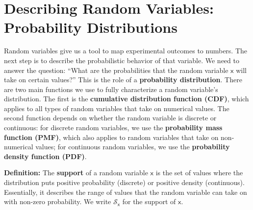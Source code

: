 \section{Describing Random Variables: Probability Distributions}
Random variables give us a tool to map experimental outcomes to numbers. The next step is to describe the probabilistic behavior of that variable. We need to answer the question: ``What are the probabilities that the random variable $\mathsf{x}$ will take on certain values?'' This is the role of a \textbf{probability distribution}. There are two main functions we use to fully characterize a random variable's distribution. The first is the \textbf{cumulative distribution function (CDF)}, which applies to all types of random variables that take on numerical values. The second function depends on whether the random variable is discrete or continuous: for discrete random variables, we use the \textbf{probability mass function (PMF)}, which also applies to random variables that take on non-numerical values; for continuous random variables, we use the \textbf{probability density function (PDF)}.

\begin{definitionBox}
    \textbf{Definition:} The \textbf{support} of a random variable $\mathsf{x}$ is the set of values where the distribution puts positive probability (discrete) or positive density (continuous). Essentially, it describes the range of values that the random variable can take on with non-zero probability. We write $\mathcal{S}_{\mathsf{x}}$ for the support of $\mathsf{x}$.
\end{definitionBox}



